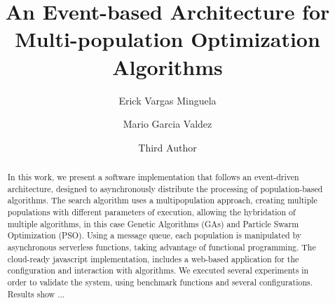 \documentclass[runningheads]{llncs}
\begin{document}
%
\title{An Event-based Architecture for Multi-population Optimization Algorithms}
%
%
\author{Erick Vargas Minguela \and
Mario Garcia Valdez \and
Third Author}
%
%
%
\maketitle              %
%
\begin{abstract}
    In this work, we present a software implementation that follows an
    event-driven architecture, designed to asynchronously distribute the
    processing of population-based algorithms. The search algorithm uses a
    multipopulation approach, creating multiple populations with different
    parameters of execution, allowing the hybridation of multiple algorithms, in
    this case Genetic Algorithms (GAs) and Particle Swarm Optimization (PSO).
    Using a message queue, each population is manipulated by asynchronous
    serverless functions, taking advantage of functional programming. The
    cloud-ready javascript implementation, includes a web-based application for
    the configuration and interaction with algorithms. We executed several
    experiments in order to validate the system, using benchmark functions and
    several configurations. Results show ...





\end{abstract}
%
%
%
\end{document}

